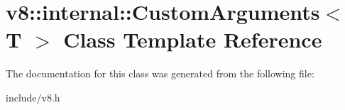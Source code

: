 \hypertarget{classv8_1_1internal_1_1_custom_arguments}{}\section{v8\+:\+:internal\+:\+:Custom\+Arguments$<$ T $>$ Class Template Reference}
\label{classv8_1_1internal_1_1_custom_arguments}


The documentation for this class was generated from the following file\+:\begin{DoxyCompactItemize}
\item 
include/v8.\+h\end{DoxyCompactItemize}
